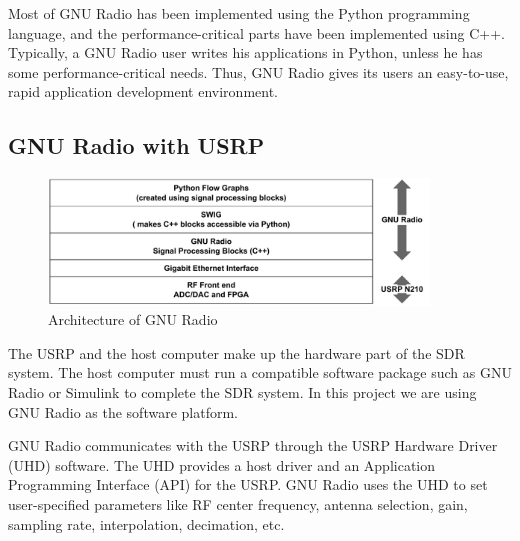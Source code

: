 Most of GNU Radio has been implemented using the Python programming language,
and the performance-critical parts have been implemented using C++. Typically,
a GNU Radio user writes his applications in Python, unless he has some
performance-critical needs. Thus, GNU Radio gives its users an easy-to-use,
rapid application development environment.

\subsection{GNU Radio with USRP}

\begin{figure}
\centering
\includegraphics[width=0.9\textwidth]{../images/gnuradio_architecture}
\caption{Architecture of GNU Radio}
\label{gnuradio_architecture}
\end{figure}

The USRP and the host computer make up the hardware part of the SDR system. 
The host computer must run a compatible software package such as GNU Radio or
Simulink to complete the SDR system. In this project we are using GNU Radio
as the software platform.

GNU Radio communicates with the USRP through the USRP Hardware Driver (UHD)
software. The UHD provides a host driver and an Application Programming
Interface (API) for the USRP. GNU Radio uses the UHD to set user-specified
parameters like RF center frequency, antenna selection, gain, sampling rate,
interpolation, decimation, etc.

